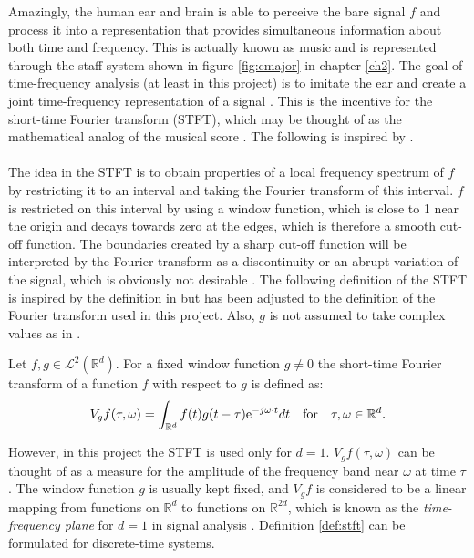 Amazingly, the human ear and brain is able to perceive the bare signal $f$ and process it into a representation that provides simultaneous information about both time and frequency. This is actually known as music and is represented through the staff system shown in figure \ref{fig:cmajor} in chapter \ref{ch2}. The goal of time-frequency analysis (at least in this project) is to imitate the ear and create a joint time-frequency representation of a signal \cite{page 22, FTFA}. This is the incentive for the short-time Fourier transform (STFT), which may be thought of as the mathematical analog of the musical score \cite{page 37, FTFA}. The following is inspired by \cite{page 37, FTFA}.
\\ \\
The idea in the STFT is to obtain properties of a local frequency spectrum of $f$ by restricting it to an interval and taking the Fourier transform of this interval. $f$ is restricted on this interval by using a window function, which is close to 1 near the origin and decays towards zero at the edges, which is therefore a smooth cut-off function. The boundaries created by a sharp cut-off function will be interpreted by the Fourier transform as a discontinuity or an abrupt variation of the signal, which is obviously not desirable \cite{Davis}. The following definition of the STFT is inspired by the definition in \cite{page 37, FTFA} but has been adjusted to the definition of the Fourier transform used in this project. Also, $g$ is not assumed to take complex values as in \cite{page 37, FTFA}.

\begin{definition}\label{def:stft}
Let $f,g \in \mathcal{L}^2(\mathbb{R}^d)$. For a fixed window function $g \neq 0$ the short-time Fourier transform of a function $f$ with respect to $g$ is defined as:
\begin{align}
V_gf(\tau,\omega) = \int_{\mathbb{R}^d} f(t) g(t - \tau) \text{e}^{-j \omega \cdot t} dt \quad \textnormal{for} \quad \tau,\omega \in \mathbb{R}^d.
\end{align}
\end{definition}

However, in this project the STFT is used only for $d = 1$. $V_gf(\tau,\omega)$ can be thought of as a measure for the amplitude of the frequency band near $\omega$ at time $\tau$. The window function $g$ is usually kept fixed, and $V_gf$ is considered to be a linear mapping from functions on $\mathbb{R}^d$ to functions on $\mathbb{R}^{2d}$, which is known as the \textit{time-frequency plane} for $d=1$ in signal analysis \cite{page 38, FTFA}. Definition \ref{def:stft} can be formulated for discrete-time systems.

